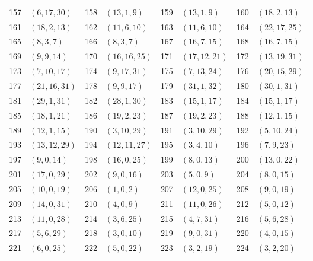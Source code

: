 \begin{longtable}{@{}r@{\quad}l@{\qquad}r@{\quad}l@{\qquad}r@{\quad}l@{\qquad}r@{\quad}l@{}}
157 & $(6,17,30)$ & 158 & $(13,1,9)$ & 159 & $(13,1,9)$ & 160 & $(18,2,13)$\\
161 & $(18,2,13)$ & 162 & $(11,6,10)$ & 163 & $(11,6,10)$ & 164 & $(22,17,25)$\\
165 & $(8,3,7)$ & 166 & $(8,3,7)$ & 167 & $(16,7,15)$ & 168 & $(16,7,15)$\\
169 & $(9,9,14)$ & 170 & $(16,16,25)$ & 171 & $(17,12,21)$ & 172 & $(13,19,31)$\\
173 & $(7,10,17)$ & 174 & $(9,17,31)$ & 175 & $(7,13,24)$ & 176 & $(20,15,29)$\\
177 & $(21,16,31)$ & 178 & $(9,9,17)$ & 179 & $(31,1,32)$ & 180 & $(30,1,31)$\\
181 & $(29,1,31)$ & 182 & $(28,1,30)$ & 183 & $(15,1,17)$ & 184 & $(15,1,17)$\\
185 & $(18,1,21)$ & 186 & $(19,2,23)$ & 187 & $(19,2,23)$ & 188 & $(12,1,15)$\\
189 & $(12,1,15)$ & 190 & $(3,10,29)$ & 191 & $(3,10,29)$ & 192 & $(5,10,24)$\\
193 & $(13,12,29)$ & 194 & $(12,11,27)$ & 195 & $(3,4,10)$ & 196 & $(7,9,23)$\\
197 & $(9,0,14)$ & 198 & $(16,0,25)$ & 199 & $(8,0,13)$ & 200 & $(13,0,22)$\\
201 & $(17,0,29)$ & 202 & $(9,0,16)$ & 203 & $(5,0,9)$ & 204 & $(8,0,15)$\\
205 & $(10,0,19)$ & 206 & $(1,0,2)$ & 207 & $(12,0,25)$ & 208 & $(9,0,19)$\\
209 & $(14,0,31)$ & 210 & $(4,0,9)$ & 211 & $(11,0,26)$ & 212 & $(5,0,12)$\\
213 & $(11,0,28)$ & 214 & $(3,6,25)$ & 215 & $(4,7,31)$ & 216 & $(5,6,28)$\\
217 & $(5,6,29)$ & 218 & $(3,0,10)$ & 219 & $(9,0,31)$ & 220 & $(4,0,15)$\\
221 & $(6,0,25)$ & 222 & $(5,0,22)$ & 223 & $(3,2,19)$ & 224 & $(3,2,20)$\\
\end{longtable}
